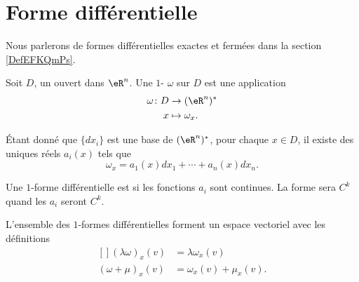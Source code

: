 \section{Forme différentielle}
\label{SecFormDiffRappel}

Nous parlerons de formes différentielles exactes et fermées dans la section \ref{DefEFKQmPs}.

\begin{definition}
	Soit $D$, un ouvert dans $\eR^n$. Une $1$- $\omega$ sur $D$ est une application
	\begin{equation}
		\begin{aligned}
				\omega\colon D&\to (\eR^n)^* \\
				x&\mapsto \omega_x. 
			\end{aligned}
		\end{equation}
\end{definition}
Étant donné que $\{ dx_i \}$ est une base de $(\eR^n)^*$, pour chaque $x\in D$, il existe des uniques réels $a_i(x)$ tels que
\begin{equation}
	\omega_x=a_1(x)dx_1+\cdots+a_n(x)dx_n.
\end{equation}

\begin{lemma}
    Une $1$-forme différentielle est  si les fonctions $a_i$ sont continues. La forme sera $C^k$ quand les $a_i$ seront $C^k$.
\end{lemma}

\begin{remark}
	L'ensemble des $1$-formes différentielles forment un espace vectoriel avec les définitions
	\begin{equation}
		\begin{aligned}[]
			(\lambda\omega)_x(v)&=\lambda\omega_x(v)\\
			(\omega+\mu)_x(v)&=\omega_x(v)+\mu_x(v).
		\end{aligned}
	\end{equation}
\end{remark}

